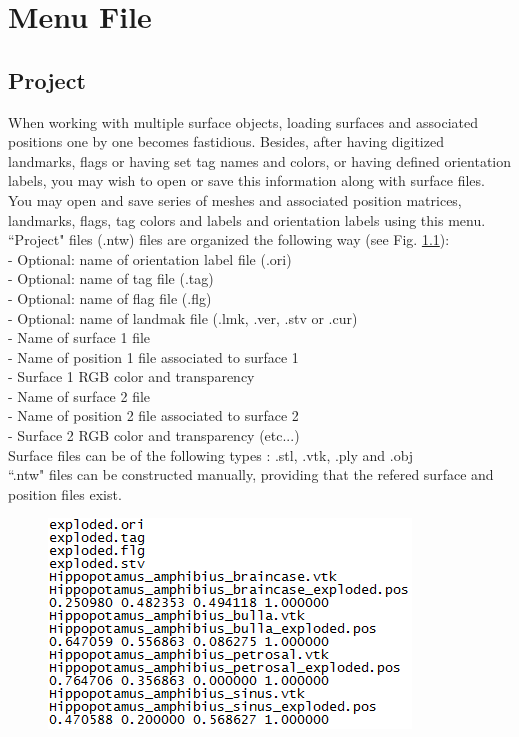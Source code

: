 \chapter{Menu File}
\minitoc  


\section{Project}
When working with multiple surface objects, loading surfaces and associated positions one by one becomes fastidious. Besides, after having digitized landmarks, flags or having set tag names and colors, or having defined orientation labels, you may wish to open or save this information along with surface files. You may open and save series of meshes and associated position matrices, landmarks, flags, tag colors and labels and orientation labels using this menu. ``Project" files (.ntw) files are organized the following way (see Fig. \ref{project_file}):\\
- Optional: name of orientation label file (.ori)\\
- Optional: name of tag file (.tag)\\
- Optional: name of flag file (.flg)\\
- Optional: name of landmak file (.lmk, .ver, .stv or .cur)\\
- Name of surface 1 file\\
- Name of position 1 file associated to surface 1\\
- Surface 1 RGB color and transparency\\
- Name of surface 2 file\\
- Name of position 2 file associated to surface 2\\
- Surface 2 RGB color and transparency (etc...)\\
 
Surface files can be of the following types : .stl, .vtk, .ply and .obj\\
``.ntw" files can be constructed manually, providing that the refered surface and position files exist.



\begin{figure}
  \centering  
 \includegraphics[scale=0.5]{images/07/project/ntw.png}
\label{project_file}
\end{figure}

